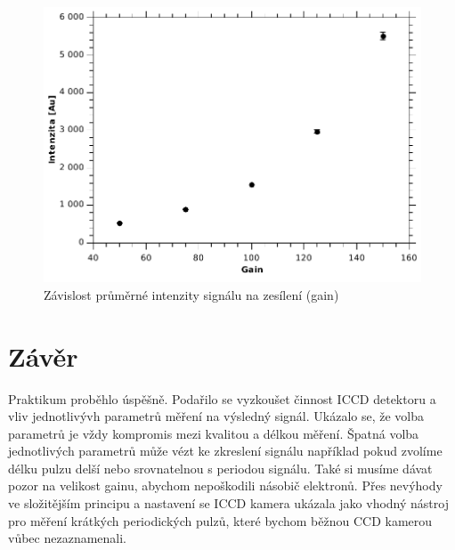 \documentclass[12pt]{article}
\begin{document}
\begin{figure}[htbp]
\begin{center}
\includegraphics[width=12cm]{intensityongain.pdf}
\caption{Závislost průměrné intenzity signálu na zesílení (gain)}
\label{gain5}
\end{center}
\end{figure}

\newpage

\section{Závěr}
Praktikum proběhlo úspěšně. Podařilo se vyzkoušet činnost ICCD detektoru a vliv jednotlivývh parametrů měření na výsledný signál. Ukázalo se, že volba parametrů je vždy kompromis mezi kvalitou a délkou měření. Špatná volba jednotlivých parametrů může vézt ke zkreslení signálu například pokud zvolíme délku pulzu delší nebo srovnatelnou s periodou signálu. Také si musíme dávat pozor na velikost gainu, abychom nepoškodili násobič elektronů. Přes nevýhody ve složitějším principu a nastavení se ICCD kamera ukázala jako vhodný nástroj pro měření krátkých periodických pulzů, které bychom běžnou CCD kamerou vůbec nezaznamenali. 
\end{document}
